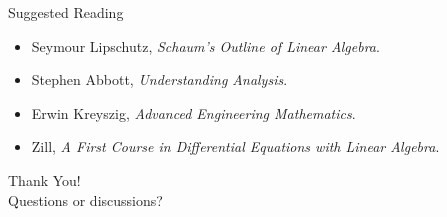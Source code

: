 \documentclass[aspectratio=169,10pt]{beamer}
\begin{document}


\begin{frame}{Suggested Reading}
\begin{itemize}
    \item Seymour Lipschutz, \textit{Schaum’s Outline of Linear Algebra}.
    \item Stephen Abbott, \textit{Understanding Analysis}.
    \item Erwin Kreyszig, \textit{Advanced Engineering Mathematics}.
    \item Zill, \textit{A First Course in Differential Equations with Linear Algebra}.
\end{itemize}
\end{frame}

\begin{frame}
Thank You! \\[1em]
Questions or discussions?
\end{frame}
\end{document}
